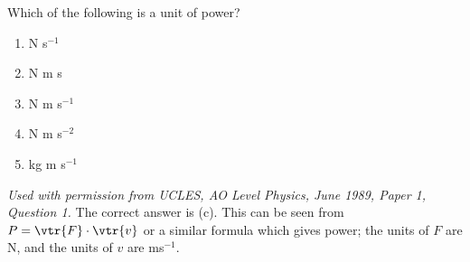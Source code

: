 
\begin{problem}[AO1989PIQ1l] 
{Which of the following is a unit of power?
\begin{enumerate}
	\item N s$^{-1}$
	\item N m s
	\item N m s$^{-1}$ \answer
	\item N m s$^{-2}$
	\item kg m s$^{-1}$
\end{enumerate}
}
{\textit{Used with permission from UCLES, AO Level Physics, June 1989, Paper 1, Question 1.}}
{The correct answer is (c). This can be seen from $P = \vtr{F}\cdot\vtr{v}$ or a similar formula which gives power; the units of $F$ are N, and the units of $v$ are ms$^{-1}$.}
\end{problem}